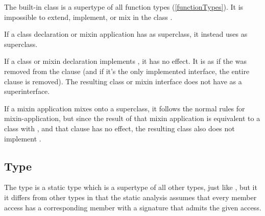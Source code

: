 \documentclass[makeidx]{article}
\begin{document}
{\LMHash{}%
The built-in class \FUNCTION{} is a supertype of all function types
(\ref{functionTypes}).
It is impossible to extend, implement, or mix in the class \FUNCTION{}.

\LMHash{}%
If a class declaration or mixin application has \FUNCTION{} as superclass,
it instead uses  as superclass.

\LMHash{}%
If a class or mixin declaration implements \FUNCTION{}, it has no effect.
It is as if the \FUNCTION was removed from the  clause
(and if it's the only implemented interface, the entire clause is removed).
The resulting class or mixin interface
does not have \FUNCTION{} as a superinterface.

\LMHash{}%
If a mixin application mixes \FUNCTION{} onto a superclass, it follows the
normal rules for mixin-application, but since the result of that mixin
application is equivalent to a class with , and
that clause has no effect, the resulting class also does not
implement \FUNCTION{}. 



\subsection{Type \DYNAMIC{}}

\LMHash{}%
The type \DYNAMIC{} is a static type which is a supertype of all other types,
just like ,
but it it differs from other types in that the static analysis
assumes that every member access has a corresponding member
with a signature that admits the given access.


}
\end{document}

